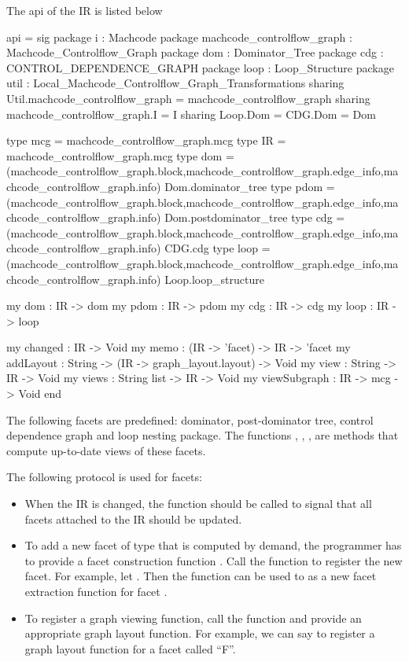 The api of the IR is listed below
\begin{SML}
 api  = sig
   package i    : Machcode
   package machcode_controlflow_graph  : Machcode_Controlflow_Graph
   package dom  : Dominator_Tree
   package cdg  : CONTROL_DEPENDENCE_GRAPH
   package loop : Loop_Structure
   package util : Local_Machcode_Controlflow_Graph_Transformations
      sharing Util.machcode_controlflow_graph = machcode_controlflow_graph
      sharing machcode_controlflow_graph.I = I 
      sharing Loop.Dom = CDG.Dom = Dom
  
   type mcg  = machcode_controlflow_graph.mcg  
   type IR   = machcode_controlflow_graph.mcg  
   type dom  = (machcode_controlflow_graph.block,machcode_controlflow_graph.edge_info,machcode_controlflow_graph.info) Dom.dominator_tree
   type pdom = (machcode_controlflow_graph.block,machcode_controlflow_graph.edge_info,machcode_controlflow_graph.info) Dom.postdominator_tree
   type cdg  = (machcode_controlflow_graph.block,machcode_controlflow_graph.edge_info,machcode_controlflow_graph.info) CDG.cdg
   type loop = (machcode_controlflow_graph.block,machcode_controlflow_graph.edge_info,machcode_controlflow_graph.info) Loop.loop_structure
 
   my dom   : IR -> dom
   my pdom  : IR -> pdom
   my cdg   : IR -> cdg
   my loop  : IR -> loop

   my changed : IR -> Void  
   my memo : (IR -> 'facet) -> IR -> 'facet
   my addLayout : String -> (IR -> graph_layout.layout) -> Void
   my view : String -> IR -> Void      
   my views : String list -> IR -> Void      
   my viewSubgraph : IR -> mcg -> Void 
 end
\end{SML}

The following facets are predefined: dominator, post-dominator tree,
control dependence graph and loop nesting package.
The functions , , , 
are  methods that
compute up-to-date views of these facets.

The following protocol is used for facets:
\begin{itemize}
\item When the IR is changed, 
the function  should be called to 
signal that all facets attached to the IR should be updated.
\item To add a new facet of type  that is computed by demand,
the programmer has to provide a facet construction 
function .  Call the function 
to register the new facet.  For example, let . 
Then the function  can be used to as a new facet extraction
function for facet .
\item To register a graph viewing function, call
the function  and provide an appropriate 
graph layout function.  For example, we can say
 to register a graph layout function
for a facet called ``F''.
\end{itemize}

